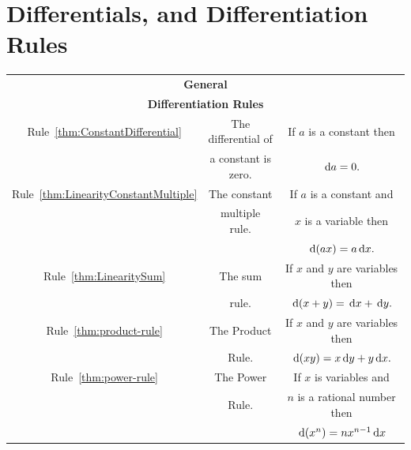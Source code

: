 \chapter{Differentials, and Differentiation Rules }
  \label{chapt:differentials}

\begin{table}
  \begin{tabular}{ |c|c|c| }
    \hline
    \multicolumn{3}{|c|}{\bf{}General} \\
    \multicolumn{3}{|c|}{\bf{}Differentiation Rules} \\
    \hline
\small    Rule~\ref{thm:ConstantDifferential}&\small    The differential of &\small If $a$ is a constant then \\
    &\small   a constant is zero.  &\small $\thinspace{\rm d}a = 0.$\\\hline
\small    Rule~\ref{thm:LinearityConstantMultiple}&\small    The constant        &\small If $a$ is a constant and\\
    &\small   multiple rule.       &\small $x$ is a variable then \\
    &\small                        &\small$\thinspace{\rm d}(ax) = a\thinspace{\rm d}x.$\\\hline
\small    Rule~\ref{thm:LinearitySum}&\small    The sum             &\small If $x$ and $y$ are variables then \\
    &\small       rule.            &\small $\thinspace{\rm d}(x+y) = \thinspace{\rm d}x + \thinspace{\rm d}y.$\\\hline{}
\small    Rule~\ref{thm:product-rule}&\small    The Product         &\small If $x$ and $y$ are variables then\\
    &\small     Rule.              &\small $\thinspace{\rm d}(xy) = x\thinspace{\rm d}y + y\thinspace{\rm d}x.$\\\hline
\small    Rule~\ref{thm:power-rule}&\small    The Power           &\small If $x$ is variables and\\
    &\small      Rule.             &\small  $n$ is a rational number then\\
    &\small                        &\small  $\thinspace{\rm d}(x^n) = nx^{n-1}\thinspace{\rm d}x$\\

\end{tabular}
\end{table}
